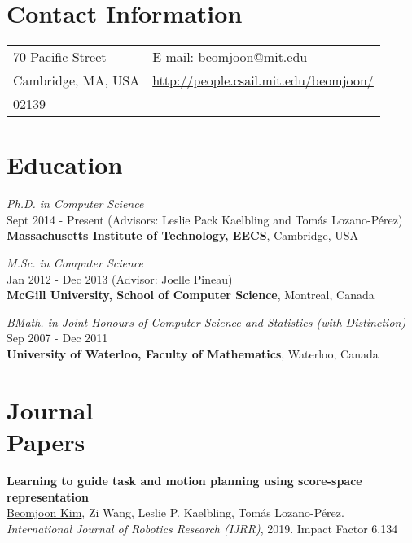 \documentclass[line,margin,letterpaper]{res}
\begin{document}
\newcommand{\sth}[0]{$^{\textrm{th}}$ }



\begin{resume}
\section{Contact Information}
\hspace{-10px}
\begin{tabular}{ll}
70 Pacific Street & E-mail: beomjoon@mit.edu\\
Cambridge, MA, USA& \small{\url{http://people.csail.mit.edu/beomjoon/}}\\
02139 & \\
\end{tabular}


\section{Education}
{\sl Ph.D. in Computer Science} \\Sept 2014 - Present (Advisors: Leslie Pack Kaelbling
and Tom\'as Lozano-P\'erez)\\
\textbf{Massachusetts Institute of Technology, EECS}, Cambridge, USA


{\sl M.Sc. in Computer Science} \\Jan 2012 - Dec 2013 (Advisor: Joelle Pineau)\\
\textbf{McGill University, School of Computer Science}, Montreal, Canada

{\sl BMath. in Joint Honours of Computer Science and Statistics (with Distinction)} \\Sep 2007 - Dec 2011\\
\textbf{University of Waterloo, Faculty of Mathematics}, Waterloo, Canada

\section{Journal\\ Papers}
\textbf{Learning to guide task and motion planning using score-space representation}\\
\underline{Beomjoon Kim}, Zi Wang, Leslie P. Kaelbling, Tom\'as Lozano-P\'erez.\\
{\sl International Journal of Robotics Research (IJRR)}, 2019.
{\small Impact Factor 6.134}


\end{resume}
\end{document}

